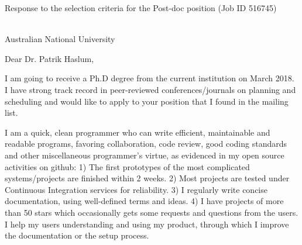 \documentclass[12pt]{letter}
\begin{document}
{
\large
Response to the selection criteria for the Post-doc position (Job ID 516745)\\
\\
}

Australian National University

\vspace{3em}

Dear Dr. Patrik Haslum,

\setlength{\parskip}{0.4em}




I am going to receive a Ph.D degree from the current institution on March 2018.
I have strong track record in peer-reviewed conferences/journals on planning and scheduling
and would like to apply to your position that I found in the mailing list.

I am a quick, clean programmer who can write efficient, maintainable and readable programs,
favoring collaboration, code review, good coding standards and other miscellaneous programmer's virtue,
as evidenced in my open source activities on github:
1) The first prototypes of the most complicated systems/projects are finished within 2 weeks.
2) Most projects are tested under Continuous Integration services for reliability.
3) I regularly write concise documentation, using well-defined terms and ideas.
4) I have projects of more than 50 stars which occasionally gets some requests and questions from the users.
 I help my users understanding and using my product, through which I improve the documentation or the setup process.
\end{document}
